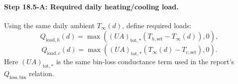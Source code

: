 \documentclass[11pt]{article}
\begin{document}
\paragraph{Step 18.5-A: Required daily heating/cooling load.}
Using the same daily ambient \(T_\infty(d)\), define required loads:
\begin{equation}
Q_{\mathrm{load},h}(d)=\max\!\left((UA)_{\mathrm{tot},*}\left(T_{h,\mathrm{set}}-T_\infty(d)\right),0\right),
\tag{18.5A-1}
\end{equation}
\begin{equation}
Q_{\mathrm{load},c}(d)=\max\!\left((UA)_{\mathrm{tot},*}\left(T_\infty(d)-T_{c,\mathrm{set}}\right),0\right).
\tag{18.5A-2}
\end{equation}
Here \((UA)_{\mathrm{tot},*}\) is the same bin-loss conductance term used in the report's \(Q_{\mathrm{loss,bin}}\) relation.
\end{document}
